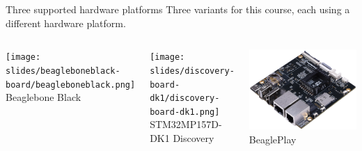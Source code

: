 \begin{frame}{Three supported hardware platforms}
  Three variants for this course, each using a different hardware
  platform.  \vfill
  \begin{columns}
    \begin{center}
      \texttt{[image: slides/beagleboneblack-board/beagleboneblack.png]}
      \newline
      Beaglebone Black
    \end{center}
    \begin{center}
      \texttt{[image: slides/discovery-board-dk1/discovery-board-dk1.png]}
      \newline
      STM32MP157D-DK1 Discovery
    \end{center}
    \begin{center}
      \includegraphics[height=0.4\textheight]{slides/beagleplay-board/beagleplay.png}
      \newline
      BeaglePlay
    \end{center}
  \end{columns}
\end{frame}

